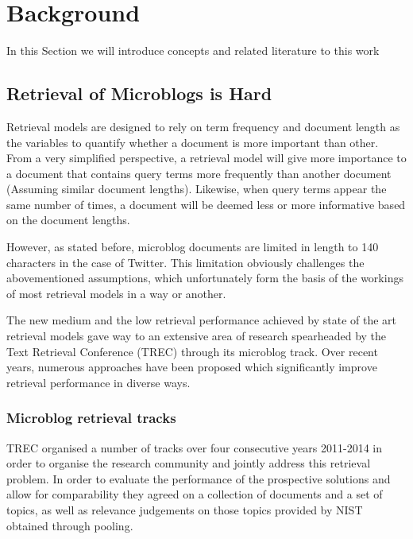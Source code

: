 \section{Background}
\label{background}

In this Section we will introduce concepts and related literature to this work\\

\subsection{Retrieval of Microblogs is Hard}
Retrieval models are designed to rely on term frequency and document length as the variables to quantify whether a document is more important than other. From a very simplified perspective, a retrieval model will give more importance to a document that contains query terms more frequently than another document (Assuming similar document lengths). Likewise, when query terms appear the same number of times, a document will be deemed less or more informative based on the document lengths.

However, as stated before, microblog documents are limited in length to 140 characters in the case of Twitter. This limitation obviously challenges the abovementioned assumptions, which unfortunately form the basis of the workings of most retrieval models in a way or another.

The new medium and the low retrieval performance achieved by state of the art retrieval models gave way to an extensive area of research spearheaded by the Text Retrieval Conference (TREC) through its microblog track. Over recent years, numerous approaches have been proposed which significantly improve retrieval performance in diverse ways. \\

\subsubsection{Microblog retrieval tracks}
TREC organised a number of tracks over four consecutive years 2011-2014 in order to organise the research community and jointly address this retrieval problem. In order to evaluate the performance of the prospective solutions and allow for comparability they agreed on a collection of documents and a set of topics, as well as relevance judgements on those topics provided by NIST obtained through pooling.

